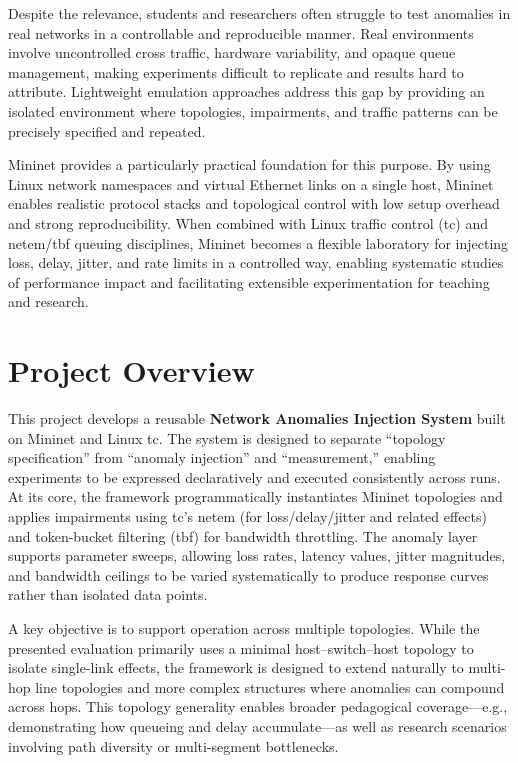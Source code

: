 \documentclass[11pt,a4paper]{article}
\begin{document}
Despite the relevance, students and researchers often struggle to test anomalies in real networks in a controllable and reproducible manner. Real environments involve uncontrolled cross traffic, hardware variability, and opaque queue management, making experiments difficult to replicate and results hard to attribute. Lightweight emulation approaches address this gap by providing an isolated environment where topologies, impairments, and traffic patterns can be precisely specified and repeated.

Mininet provides a particularly practical foundation for this purpose. By using Linux network namespaces and virtual Ethernet links on a single host, Mininet enables realistic protocol stacks and topological control with low setup overhead and strong reproducibility. When combined with Linux traffic control (tc) and netem/tbf queuing disciplines, Mininet becomes a flexible laboratory for injecting loss, delay, jitter, and rate limits in a controlled way, enabling systematic studies of performance impact and facilitating extensible experimentation for teaching and research.

\section{Project Overview}

This project develops a reusable \textbf{Network Anomalies Injection System} built on Mininet and Linux tc. The system is designed to separate ``topology specification'' from ``anomaly injection'' and ``measurement,'' enabling experiments to be expressed declaratively and executed consistently across runs. At its core, the framework programmatically instantiates Mininet topologies and applies impairments using tc's netem (for loss/delay/jitter and related effects) and token-bucket filtering (tbf) for bandwidth throttling. The anomaly layer supports parameter sweeps, allowing loss rates, latency values, jitter magnitudes, and bandwidth ceilings to be varied systematically to produce response curves rather than isolated data points.

A key objective is to support operation across multiple topologies. While the presented evaluation primarily uses a minimal host–switch–host topology to isolate single-link effects, the framework is designed to extend naturally to multi-hop line topologies and more complex structures where anomalies can compound across hops. This topology generality enables broader pedagogical coverage—e.g., demonstrating how queueing and delay accumulate—as well as research scenarios involving path diversity or multi-segment bottlenecks.
\end{document}
